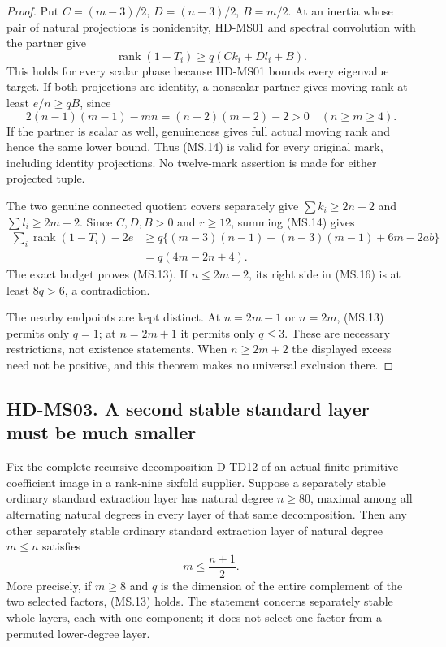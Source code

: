 \begin{proof}
Put $C=(m-3)/2$, $D=(n-3)/2$, $B=m/2$.
At an inertia whose pair of natural projections is nonidentity,
HD-MS01 and spectral convolution with the partner give
\[
          \operatorname{rank}(1-T_i)
                  \ge q(Ck_i+Dl_i+B).
 \tag{MS.14}
\]
This holds for every scalar phase because HD-MS01 bounds every
eigenvalue target. If both projections are identity, a nonscalar
partner gives moving rank at least $e/n\ge qB$, since
\[
 2(n-1)(m-1)-mn=(n-2)(m-2)-2>0
 \quad(n\ge m\ge4).
 \tag{MS.15}
\]
If the partner is scalar as well, genuineness gives full actual
moving rank and hence the same lower bound. Thus (MS.14) is
valid for every original mark, including identity projections.
No twelve-mark assertion is made for either projected tuple.

The two genuine connected quotient covers separately give
$\sum k_i\ge2n-2$ and $\sum l_i\ge2m-2$.
Since $C,D,B>0$ and $r\ge12$, summing (MS.14) gives
\[
 \begin{split}
 \sum_i\operatorname{rank}(1-T_i)-2e
 &\ge q\{(m-3)(n-1)+(n-3)(m-1)+6m-2ab\}\\
 &=q(4m-2n+4).
 \end{split}
 \tag{MS.16}
\]
The exact budget proves (MS.13). If $n\le2m-2$, its right
side in (MS.16) is at least $8q>6$, a contradiction.

The nearby endpoints are kept distinct. At $n=2m-1$ or $n=2m$,
(MS.13) permits only $q=1$; at $n=2m+1$ it permits only
$q\le3$. These are necessary restrictions, not existence
statements. When $n\ge2m+2$ the displayed excess need not
be positive, and this theorem makes no universal exclusion there.
\end{proof}

\subsection*{HD-MS03. A second stable standard layer must be much smaller}

\begin{corollary}[HD-MS03]
Fix the complete recursive decomposition D-TD12 of an actual
finite primitive coefficient image in a rank-nine sixfold supplier.
Suppose a separately stable ordinary standard extraction layer
has natural degree $n\ge80$, maximal among all alternating
natural degrees in every layer of that same decomposition.
Then any other separately stable ordinary standard extraction
layer of natural degree $m\le n$ satisfies
\[
                              m\le\frac{n+1}{2}.
 \tag{MS.17}
\]
More precisely, if $m\ge8$ and $q$ is the dimension of the
entire complement of the two selected factors, (MS.13) holds.
The statement concerns separately stable whole layers, each
with one component; it does not select one factor from a
permuted lower-degree layer.
\end{corollary}

